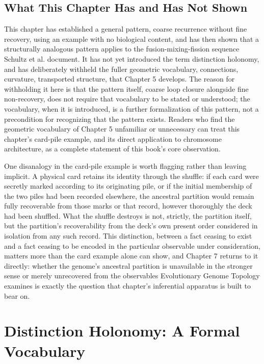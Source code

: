 \documentclass[11pt]{book}
\begin{document}
\section{What This Chapter Has and Has Not Shown}

This chapter has established a general pattern, coarse recurrence without fine recovery, using an example with no biological content, and has then shown that a structurally analogous pattern applies to the fusion-mixing-fission sequence Schultz et al. document. It has not yet introduced the term distinction holonomy, and has deliberately withheld the fuller geometric vocabulary, connections, curvature, transported structure, that Chapter 5 develops. The reason for withholding it here is that the pattern itself, coarse loop closure alongside fine non-recovery, does not require that vocabulary to be stated or understood; the vocabulary, when it is introduced, is a further formalization of this pattern, not a precondition for recognizing that the pattern exists. Readers who find the geometric vocabulary of Chapter 5 unfamiliar or unnecessary can treat this chapter's card-pile example, and its direct application to chromosome architecture, as a complete statement of this book's core observation.

One disanalogy in the card-pile example is worth flagging rather than leaving implicit. A physical card retains its identity through the shuffle: if each card were secretly marked according to its originating pile, or if the initial membership of the two piles had been recorded elsewhere, the ancestral partition would remain fully recoverable from those marks or that record, however thoroughly the deck had been shuffled. What the shuffle destroys is not, strictly, the partition itself, but the partition's recoverability from the deck's own present order considered in isolation from any such record. This distinction, between a fact ceasing to exist and a fact ceasing to be encoded in the particular observable under consideration, matters more than the card example alone can show, and Chapter 7 returns to it directly: whether the genome's ancestral partition is unavailable in the stronger sense or merely unrecovered from the observables Evolutionary Genome Topology examines is exactly the question that chapter's inferential apparatus is built to bear on.

\chapter{Distinction Holonomy: A Formal Vocabulary}
\end{document}
